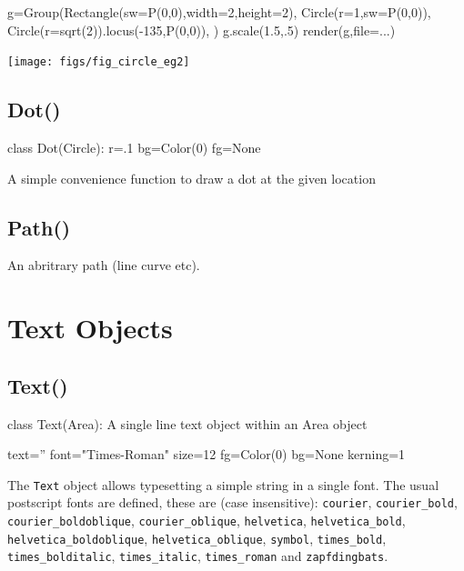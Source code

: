 \documentclass[a4paper]{book}
\begin{document}
\begin{example}
\begin{python}
g=Group(Rectangle(sw=P(0,0),width=2,height=2),
        Circle(r=1,sw=P(0,0)),
        Circle(r=sqrt(2)).locus(-135,P(0,0)),
        )
g.scale(1.5,.5)
render(g,file=...)
\end{python}
\begin{center}
  \texttt{[image: figs/fig\_circle\_eg2]}
\end{center}
\end{example}

\subsection{Dot()}
\label{sec:dot}
\begin{python}
class Dot(Circle):
    r=.1
    bg=Color(0)
    fg=None
\end{python}

A simple convenience function to draw a dot at the given location

\subsection{Path()}
\label{sec:path}

An abritrary path (line curve etc).

\section{Text Objects}

\subsection{Text()}
\label{sec:text}
\begin{python}
class Text(Area):
    A single line text object within an Area object
    
    text=''
    font="Times-Roman"
    size=12
    fg=Color(0)
    bg=None
    kerning=1
\end{python}
The \Verb|Text| object allows typesetting a simple string in a single
font. The usual postscript fonts are defined, these are (case
insensitive): \Verb|courier|, \Verb|courier_bold|,
\Verb|courier_boldoblique|, \Verb|courier_oblique|, \Verb|helvetica|,
\Verb|helvetica_bold|, \Verb|helvetica_boldoblique|,
\Verb|helvetica_oblique|, \Verb|symbol|, \Verb|times_bold|,
\Verb|times_bolditalic|, \Verb|times_italic|, \Verb|times_roman| and
\Verb|zapfdingbats|.
\end{document}
